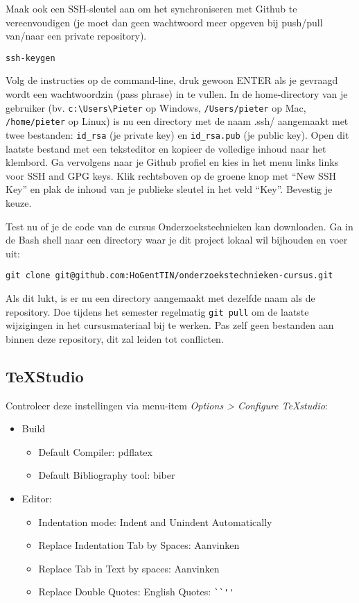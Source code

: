 Maak ook een SSH-sleutel aan om het synchroniseren met Github te vereenvoudigen (je moet dan geen wachtwoord meer opgeven bij push/pull van/naar een private repository).

\begin{verbatim}
ssh-keygen
\end{verbatim}

Volg de instructies op de command-line, druk gewoon ENTER als je gevraagd wordt een wachtwoordzin (pass phrase) in te vullen. In de home-directory van je gebruiker (bv. \verb|c:\Users\Pieter| op Windows, \verb|/Users/pieter| op Mac, \verb|/home/pieter| op Linux) is nu een directory met de naam .ssh/ aangemaakt met twee bestanden: \verb|id_rsa| (je private key) en \verb|id_rsa.pub| (je public key). Open dit laatste bestand met een teksteditor en kopieer de volledige inhoud naar het klembord. Ga vervolgens naar je Github profiel en kies in het menu links links voor SSH and GPG keys. Klik rechtsboven op de groene knop met ``New SSH Key'' en plak de inhoud van je publieke sleutel in het veld ``Key''. Bevestig je keuze.

Test nu of je de code van de cursus Onderzoekstechnieken kan downloaden. Ga in de Bash shell naar een directory waar je dit project lokaal wil bijhouden en voer uit:

\begin{verbatim}
git clone git@github.com:HoGentTIN/onderzoekstechnieken-cursus.git
\end{verbatim}

Als dit lukt, is er nu een directory aangemaakt met dezelfde naam als de repository. Doe tijdens het semester regelmatig \texttt{git pull} om de laatste wijzigingen in het cursusmateriaal bij te werken. Pas zelf geen bestanden aan binnen deze repository, dit zal leiden tot conflicten.

\subsection{TeXStudio}

Controleer deze instellingen via menu-item \emph{Options > Configure TeXstudio}:

\begin{itemize}
  \item Build
  \begin{itemize}
    \item Default Compiler: pdflatex
    \item Default Bibliography tool: biber
  \end{itemize}
  \item Editor:
  \begin{itemize}
    \item Indentation mode: Indent and Unindent Automatically
    \item Replace Indentation Tab by Spaces: Aanvinken
    \item Replace Tab in Text by spaces: Aanvinken
    \item Replace Double Quotes: English Quotes: \verb|``''|
  \end{itemize}

\end{itemize}

